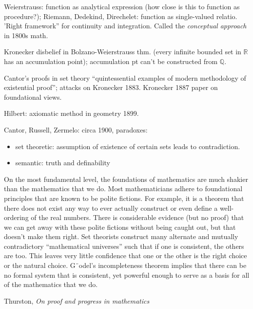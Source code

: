 Weierstrauss: function as analytical expression 
(how close is this to function as procedure?);
Riemann, Dedekind, Direchelet: function as single-valued relatio.
'Right framework'' for continuity and integration.
Called the \textit{conceptual approach} in 1800s math.

Kronecker disbelief in Bolzano-Weierstrauss thm.
(every infinite bounded set in $\mathbb{R}$ 
has an accumulation point);
accumulation pt can't be constructed from $\mathbb{Q}$.

Cantor's proofs in set theory ``quintessential examples
of modern methodology of existential proof''; 
attacks on Kronecker 1883.
Kronecker 1887 paper on foundational views.

Hilbert: axiomatic method in geometry 1899.

Cantor, Russell, Zermelo: circa 1900, paradoxes:
\begin{itemize}
  \item set theoretic: assumption of existence of certain sets
  leads to contradiction.
  \item semantic: truth and definability
\end{itemize}


\setcounter{currentlevel}{\value{baseSectionLevel}}
\label{sec:Logic}

\epigraph{On the most fundamental level, the foundations of mathematics are much shakier
than the mathematics that we do. Most mathematicians adhere to foundational
principles that are known to be polite fictions. For example, it is a theorem that
there does not exist any way to ever actually construct or even define a well-ordering
of the real numbers. There is considerable evidence (but no proof) that we can get
away with these polite fictions without being caught out, but that doesn’t make
them right. Set theorists construct many alternate and mutually contradictory
“mathematical universes” such that if one is consistent, the others are too. This
leaves very little confidence that one or the other is the right choice or the natural
choice. G¨odel’s incompleteness theorem implies that there can be no formal system
that is consistent, yet powerful enough to serve as a basis for all of the mathematics
that we do.}%
{Thurston, \textit{On proof and progress in mathematics}~\cite{thurston1994proof}}


